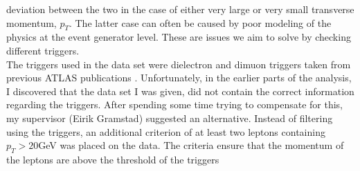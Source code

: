 deviation between the two in the case of either very large or very small transverse momentum, $p_T$. The latter case can 
often be caused by poor modeling of the physics at the event generator level. These are issues we aim to solve by checking
different triggers. 
\\
The triggers used in the data set were dielectron and dimuon triggers taken from previous \ac{ATLAS} publications 
\cite{atlas_collaboration_performance_2017, atlas_collaboration_performance_muons, atlas_collaboration_photons}.
Unfortunately, in the earlier parts of the analysis, I discovered that the data set I was given, did not contain the correct information 
regarding the triggers. After spending some time trying to compensate for this, my supervisor (Eirik Gramstad) suggested an alternative.
Instead of filtering using the triggers, an additional criterion of at least two leptons containing $p_T>20$GeV was placed on the data.
The criteria ensure that the momentum of the leptons are above the threshold of the triggers

